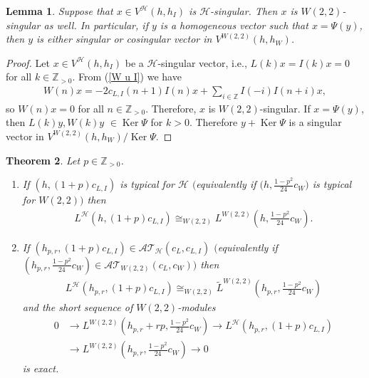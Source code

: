 \documentclass[pdftex]{sigma}
\numberwithin{equation}{section}
\newtheorem{Theorem}{Theorem}[section]
\newtheorem{Lemma}[Theorem]{Lemma}
\newcommand{\N}{{\mathbb Z}_{> 0} }
\newcommand{\Z}{\mathbb Z}
\newcommand{\HVir}{\mathcal H}
\DeclareMathOperator{\Ker}{Ker}
\begin{document}
\begin{Lemma}\label{H-sing je W-sing}Suppose that $x\in V^{\HVir}(h,h_I)$ is $\HVir$-singular. Then $x$ is $W(2,2)$-singular as well. In particular, if $y$ is a homogeneous vector such that $x = \Psi(y)$, then $y$ is either singular or cosingular vector in $V^{W(2,2)}(h,h_W)$.
\end{Lemma}

\begin{proof}
Let $x\in V^{\HVir}(h,h_I)$ be a $\HVir$-singular vector, i.e., $L(k)x=I(k)x=0$ for all $k\in\N$. From (\ref{W u I}) we have
\begin{gather*}
W(n)x = -2c_{L,I}(n+1) I(n)x+\sum_{i\in \Z}I(-i)I(n+i)x,
\end{gather*}
so $W(n)x=0$ for all $n\in\N$. Therefore, $x$ is $W(2,2)$-singular.
If $x=\Psi(y)$, then $L(k)y, W(k)y$ $\in \Ker \Psi$ for $k>0$. Therefore $y + \Ker \Psi$ is a singular vector in $V^{W(2,2)}(h,h_W) / \Ker \Psi$.
\end{proof}

\begin{Theorem} \label{t33} \label{L za +}Let $p\in\N$.
\begin{enumerate}\itemsep=0pt
\item[$(i)$] If $(h,(1+p) c_{L,I})$ is typical for $\HVir$ $($equivalently if $\big(h,\frac{1-p^{2}}{24}c_{W}\big) $ is typical for $W(2,2))$ then
\begin{gather}
L^{\HVir}(h,(1+p) c_{L,I}) \cong_{W(2,2) }L^{W(2,2)}\left( h,\frac{1-p^{2}}{24}c_{W}\right).\label{L + gen}
\end{gather}

\item[$(ii)$] If $(h_{p,r},(1+p) c_{L,I}) \in {\mathcal {AT} }_{\HVir} ( c_L, c_{L,I} )$ $($equivalently if $ (h_{p,r},\frac{1-p^{2}}{24}c_{W}) \in {\mathcal {AT} }_{W(2,2)} ( c_L, c_W ))$ then
\begin{gather*}
L^{\HVir}(h_{p,r},(1+p) c_{L,I}) \cong_{W(2,2) }\widetilde{L}^{W(2,2)}\left( h_{p,r},\frac{1-p^{2}}{24}c_{W}\right) %
\end{gather*}
and the short sequence of $W(2,2)$-modules
\begin{align}
0 & \rightarrow L^{W(2,2)}\left( h_{p,r}+rp,\frac{1-p^{2}}{24}c_{W}\right)\rightarrow L^{\HVir}(h_{p,r},(1+p) c_{L,I}) \label{seq +} \\
& \rightarrow L^{W(2,2)}\left( h_{p,r},\frac{1-p^{2}}{24}c_{W}\right) \rightarrow0 \nonumber
\end{align}
is exact.
\end{enumerate}
\end{Theorem}
\end{document}
